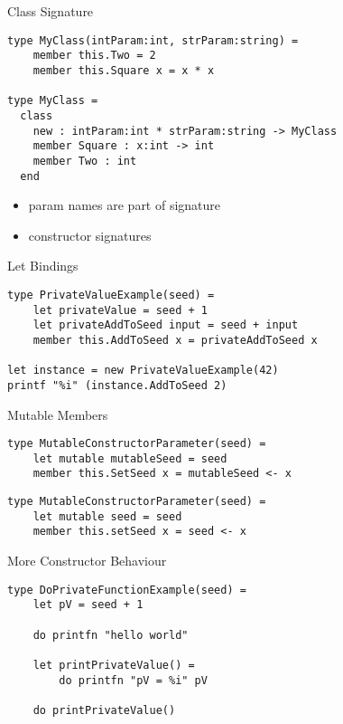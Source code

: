 \documentclass{beamer}
\begin{document}
\begin{frame}[fragile]{Class Signature}
  \begin{verbatim}
type MyClass(intParam:int, strParam:string) = 
    member this.Two = 2
    member this.Square x = x * x

type MyClass =
  class
    new : intParam:int * strParam:string -> MyClass
    member Square : x:int -> int
    member Two : int
  end
  \end{verbatim}
  \begin{itemize}
    \item param names are part of signature
    \item constructor signatures
  \end{itemize}
\end{frame}

\begin{frame}[fragile]{Let Bindings}
  \begin{verbatim}
type PrivateValueExample(seed) =
    let privateValue = seed + 1
    let privateAddToSeed input = seed + input
    member this.AddToSeed x = privateAddToSeed x

let instance = new PrivateValueExample(42)
printf "%i" (instance.AddToSeed 2)
  \end{verbatim}
\end{frame}

\begin{frame}[fragile]{Mutable Members}
  \begin{verbatim}
type MutableConstructorParameter(seed) =
    let mutable mutableSeed = seed
    member this.SetSeed x = mutableSeed <- x
  \end{verbatim}
  \pause
  \begin{verbatim}
type MutableConstructorParameter(seed) =
    let mutable seed = seed
    member this.setSeed x = seed <- x
  \end{verbatim}
\end{frame}

\begin{frame}[fragile]{More Constructor Behaviour}
  \begin{verbatim}
type DoPrivateFunctionExample(seed) =
    let pV = seed + 1

    do printfn "hello world"

    let printPrivateValue() =
        do printfn "pV = %i" pV

    do printPrivateValue()
  \end{verbatim}
\end{frame}
\end{document}
